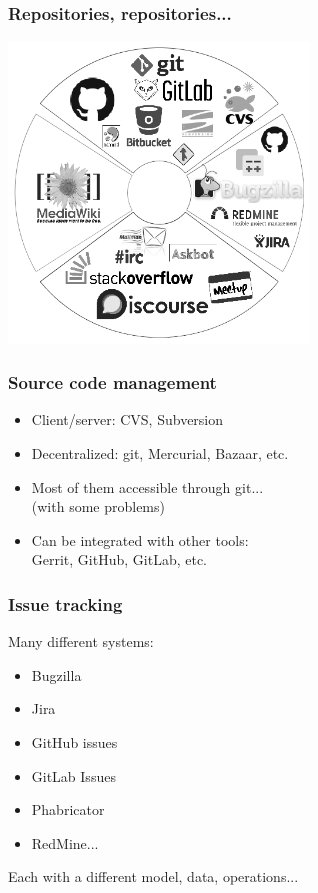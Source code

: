 \documentclass[17pt,aspectratio=169,hyperref=pdfusetitle]{beamer}
\begin{document}
\begin{frame}
  \frametitle{Repositories, repositories...}

  \begin{center}
    \includegraphics[height=8cm]{figs/data-sources}
  \end{center}
\end{frame}


\begin{frame}
\frametitle{Source code management}

\begin{itemize}
\item Client/server: CVS, Subversion
\item Decentralized: git, Mercurial, Bazaar, etc.
\item Most of them accessible through git... \\
  (with some problems)
\item Can be integrated with other tools: \\
  Gerrit, GitHub, GitLab, etc.
\end{itemize}
\end{frame}


\begin{frame}
\frametitle{Issue tracking}

Many different systems:

\begin{itemize}
\item Bugzilla
\item Jira
\item GitHub issues
\item GitLab Issues
\item Phabricator
\item RedMine...
\end{itemize}

Each with a different model, data, operations...

\end{frame}
\end{document}
